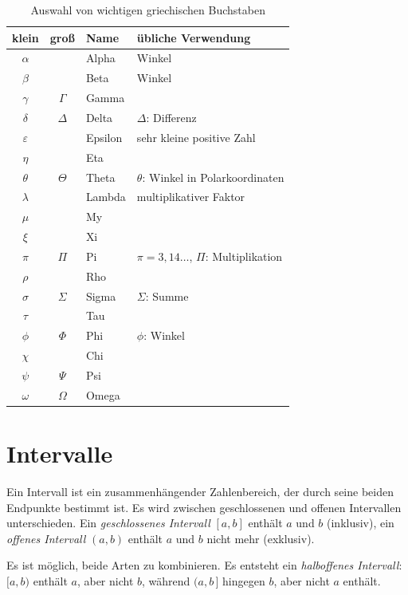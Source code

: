 \begin{table}
\begin{tabular}{cclp{17em}}
\textbf{klein} & \textbf{groß} & \textbf{Name} & \textbf{übliche Verwendung}\\
\hline
$\alpha$& & Alpha & Winkel\\
$\beta$ & & Beta & Winkel\\
$\gamma$ & $\Gamma$ & Gamma & \\
$\delta$ & $\Delta$ & Delta & $\Delta$: Differenz\\
$\varepsilon$ & & Epsilon & sehr kleine positive Zahl\\
$\eta$ & & Eta\\
$\theta$ & $\Theta$ &  Theta & $\theta$: Winkel in Polarkoordinaten\\
$\lambda$ & &  Lambda & multiplikativer Faktor\\
$\mu$ & & My\\
$\xi$ & & Xi \\
$\pi$ & $\Pi$ & Pi & $\pi = 3,14\dots$, $\Pi$: Multiplikation\\
$\rho$ & & Rho\\
$\sigma$ & $\Sigma$ & Sigma & $\Sigma$: Summe\\
$\tau$ & & Tau \\
$\phi$ & $\Phi$ & Phi & $\phi$: Winkel \\
$\chi$ & & Chi \\
$\psi$ & $\Psi$ & Psi \\
$\omega$ & $\Omega$ & Omega\\
\end{tabular}
\label{tab:griechisch}
\caption{Auswahl von wichtigen griechischen Buchstaben}
\end{table}


\section{Intervalle}
Ein Intervall ist ein zusammenhängender Zahlenbereich, der durch seine beiden
Endpunkte bestimmt ist. Es wird zwischen geschlossenen und
offenen Intervallen unterschieden. Ein \emph{geschlossenes Intervall}
$[a,b]$ enthält $a$ und $b$ (inklusiv), ein \emph{offenes Intervall}
$(a,b)$ enthält $a$ und $b$ nicht mehr (exklusiv).

Es ist möglich, beide Arten zu kombinieren. Es entsteht ein
\emph{halboffenes Intervall}: $[a,b)$ enthält $a$, aber nicht $b$, während
$(a,b\,]$ hingegen $b$, aber nicht $a$ enthält.

